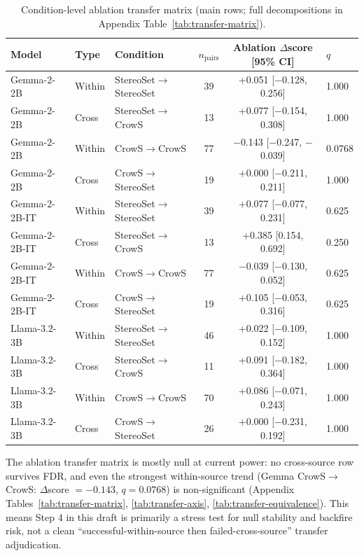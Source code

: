 \begin{table}[t]
\centering
\footnotesize
\setlength{\tabcolsep}{3pt}
\begin{tabular}{@{}lllccl@{}}
\toprule
Model & Type & Condition & $n_{\text{pairs}}$ & Ablation $\Delta$score [95\% CI] & $q$ \\
\midrule
Gemma-2-2B & Within & StereoSet$\rightarrow$StereoSet & 39 & +0.051 [$-$0.128, 0.256] & 1.000 \\
Gemma-2-2B & Cross & StereoSet$\rightarrow$CrowS & 13 & +0.077 [$-$0.154, 0.308] & 1.000 \\
Gemma-2-2B & Within & CrowS$\rightarrow$CrowS & 77 & $-$0.143 [$-$0.247, $-$0.039] & 0.0768 \\
Gemma-2-2B & Cross & CrowS$\rightarrow$StereoSet & 19 & +0.000 [$-$0.211, 0.211] & 1.000 \\
\midrule
Gemma-2-2B-IT & Within & StereoSet$\rightarrow$StereoSet & 39 & +0.077 [$-$0.077, 0.231] & 0.625 \\
Gemma-2-2B-IT & Cross & StereoSet$\rightarrow$CrowS & 13 & +0.385 [0.154, 0.692] & 0.250 \\
Gemma-2-2B-IT & Within & CrowS$\rightarrow$CrowS & 77 & $-$0.039 [$-$0.130, 0.052] & 0.625 \\
Gemma-2-2B-IT & Cross & CrowS$\rightarrow$StereoSet & 19 & +0.105 [$-$0.053, 0.316] & 0.625 \\
\midrule
Llama-3.2-3B & Within & StereoSet$\rightarrow$StereoSet & 46 & +0.022 [$-$0.109, 0.152] & 1.000 \\
Llama-3.2-3B & Cross & StereoSet$\rightarrow$CrowS & 11 & +0.091 [$-$0.182, 0.364] & 1.000 \\
Llama-3.2-3B & Within & CrowS$\rightarrow$CrowS & 70 & +0.086 [$-$0.071, 0.243] & 1.000 \\
Llama-3.2-3B & Cross & CrowS$\rightarrow$StereoSet & 26 & +0.000 [$-$0.231, 0.192] & 1.000 \\
\bottomrule
\end{tabular}
\caption{Condition-level ablation transfer matrix (main rows; full decompositions in Appendix Table~\ref{tab:transfer-matrix}).}
\label{tab:transfer-main}
\end{table}

The ablation transfer matrix is mostly null at current power: no cross-source row survives FDR, and even the strongest within-source trend (Gemma CrowS$\rightarrow$CrowS: $\Delta$score $=-0.143$, $q=0.0768$) is non-significant (Appendix Tables~\ref{tab:transfer-matrix}, \ref{tab:transfer-axis}, \ref{tab:transfer-equivalence}). This means Step 4 in this draft is primarily a stress test for null stability and backfire risk, not a clean ``successful-within-source then failed-cross-source'' transfer adjudication.


